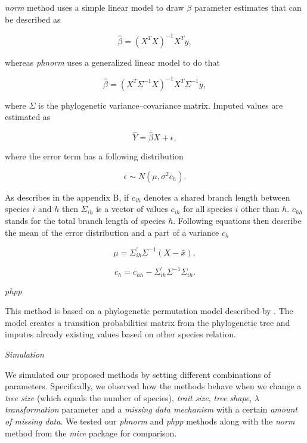 \documentclass[hidelinks,a4paper]{article}
\renewcommand{\subsection}[1]{%
\bigskip
\begin{center}
\begin{large}
\normalfont\itshape #1
\end{large}
\end{center}}
\begin{document}
\begin{multicols}{2}
\emph{norm} method uses a simple linear model to draw $\beta$ parameter estimates that can be described as

\begin{equation}
\hat{\beta} = (X^T X)^{-1} X^T y,
\end{equation}

whereas \emph{phnorm} uses a generalized linear model to do that

\begin{equation}
\hat{\beta} = (X^T \Sigma^{-1} X)^{-1} X^T \Sigma^{-1} y,
\end{equation}

where $\Sigma$ is the phylogenetic variance--covariance matrix. Imputed values are estimated as

\begin{equation}
\hat{Y} = \hat{\beta} X + \epsilon,
\end{equation}

where the error term has a following distribution

\begin{equation}
\epsilon \sim N(\mu, \sigma^2 c_h).
\end{equation}

As \cite{Garland2000} describes in the appendix B, if $c_{ih}$ denotes a shared branch length between species $i$ and $h$ then $\Sigma_{ih}$ is a vector of values $c_{ih}$ for all species $i$ other than $h$. $c_{hh}$ stands for the total branch length of species $h$. Following equations then describe the mean of the error distribution and a part of a variance $c_h$

\begin{equation}
\mu = \Sigma^{'}_{ih} \Sigma^{-1} (X - \bar{x}),
\end{equation}

\begin{equation}
c_h = c_{hh} - \Sigma^{'}_{ih} \Sigma^{-1} \Sigma_{ih}.
\end{equation}

\subsection{phpp}
This method is based on a phylogenetic permutation model described by \cite{lapointe2001generalized}. The model creates a transition probabilities matrix from the phylogenetic tree and imputes already existing values based on other species relation.

\subsection{Simulation}
We simulated our proposed methods by setting different combinations of parameters. Specifically, we observed how the methods behave when we change a \emph{tree size} (which equals the number of species), \emph{trait size}, \emph{tree shape}, \emph{$\lambda$ transformation} parameter and a \emph{missing data mechanism} with a certain \emph{amount of missing data}. We tested our \emph{phnorm} and \emph{phpp} methods along with the \emph{norm} method from the \emph{mice} package for comparison.


\end{multicols}
\end{document}
